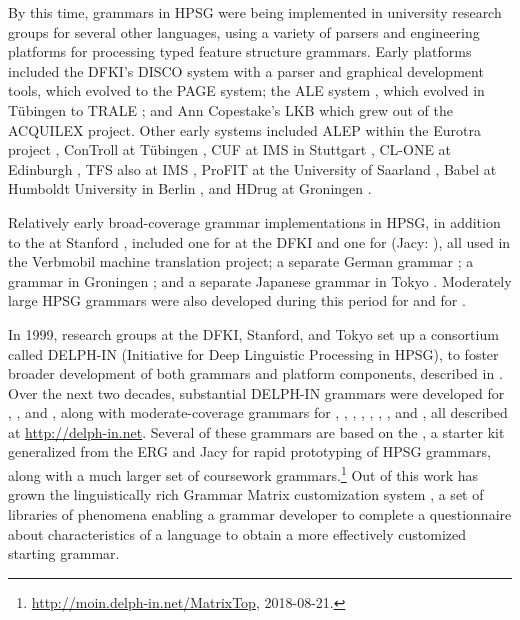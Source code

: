 \documentclass[output=paper]{langsci/langscibook}
\begin{document}
By this time, grammars in HPSG were being implemented in university research groups for several other languages, using a variety of parsers and engineering platforms for processing typed feature structure grammars.  Early platforms included the DFKI's DISCO system \citep{DISCO94} with a parser and graphical development tools, which evolved to the PAGE system; the ALE system \citep{Franz:90,CP96}, which evolved in T{\"u}bingen to TRALE \citep{MPR2002a-u,Penn2004a-u}; and Ann Copestake's LKB \citep{Copestake2002a-Short} which grew out of the ACQUILEX project.  Other early systems included ALEP within the Eurotra project \citep{SimpGron1994}, ConTroll at T{\"u}bingen \citep{GoetzMeurers1997}, CUF at IMS in Stuttgart \citep{DD93a-u}, CL-ONE at Edinburgh \citep{Manandhar1994}, TFS also at IMS \citep{Emele94a-u}, ProFIT at the University of Saarland \citep{Erbach95a}, Babel at Humboldt University in Berlin \citep{Babel}, and HDrug at Groningen \citep{NB97b-u}.  

Relatively early broad-coverage grammar implementations in HPSG, in addition to the  at Stanford \citep{erg}, included one for  at the DFKI \citep{MK2000a} and one for  (Jacy: \citet{Siegel2000a}), all used in the Verbmobil machine translation project; a separate German grammar \citep{Babel,Mueller99a}; a  grammar in Groningen \citep*{BvNM2001a-u}; and a separate Japanese grammar in Tokyo \citep{MNT2005a-u}.  Moderately large HPSG grammars were also developed during this period for  \citep{KY2003a-u} and for  \citep*{myk:etal:02}.  

In 1999, research groups at the DFKI, Stanford, and Tokyo set up a consortium called DELPH-IN (Initiative for Deep Linguistic Processing in HPSG), to foster broader development of both grammars and platform components, described in \citet*{OFTU2002a-ed}.  Over the next two decades, substantial DELPH-IN grammars were developed for  \citep{HH2004a-u},  \citep{BrancoCosta2010}, and  \citep{MARIMON10.602}, along with moderate-coverage grammars for  \citep{Osenova2011},  \citep{KN2005a-u},  \citep{Crysmann2012a-u},  \citep*{AHMW2015a-u},  \citep{Moeljadietal2015},  \citep{FSB2015a-u}, , and  \citep{Bender2008}, all described at \url{http://delph-in.net}.  Several of these grammars are based on the  \citep*{BFO2002a-u}, a starter kit generalized from the ERG and Jacy for rapid prototyping of HPSG grammars, along with a much larger set of coursework grammars.\footnote{\url{http://moin.delph-in.net/MatrixTop}, 2018-08-21.}  Out of this work has grown the linguistically rich Grammar Matrix customization system \citep*{Ben:Dre:Fok:Pou:Sal:10}, a set of libraries of phenomena enabling a grammar developer to complete a questionnaire about characteristics of a language to obtain a more effectively customized starting grammar.
\end{document}
